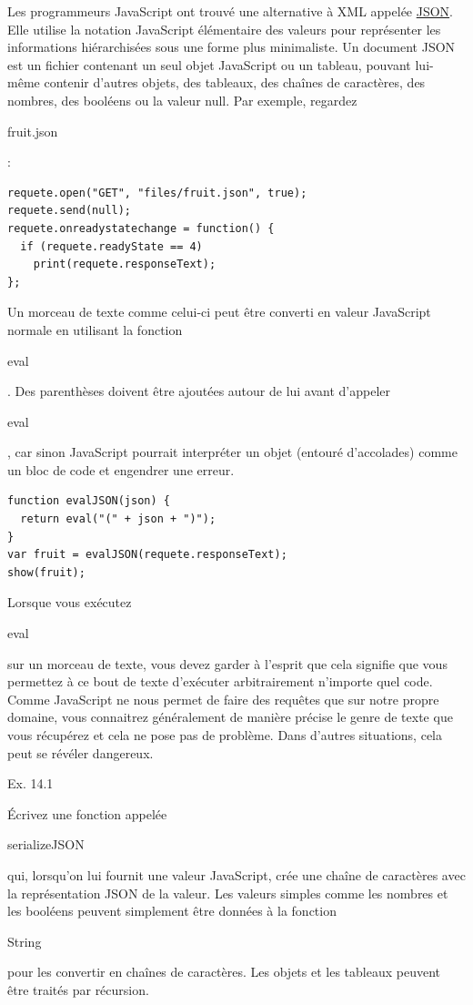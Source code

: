 \documentclass{FramateX}
\renewcommand{\texttt}[1]{\begin{sffamily}{#1}\end{sffamily}}
\begin{document}
\begin{center}\end{center}

Les programmeurs JavaScript ont trouvé une alternative à XML appelée
\href{http://www.json.org}{JSON}. Elle utilise la notation JavaScript
élémentaire des valeurs pour représenter les informations hiérarchisées
sous une forme plus minimaliste. Un document JSON est un fichier
contenant un seul objet JavaScript ou un tableau, pouvant lui-même
contenir d'autres objets, des tableaux, des chaînes de caractères, des
nombres, des booléens ou la valeur null. Par exemple, regardez
\texttt{fruit.json} :

\begin{lstlisting}
requete.open("GET", "files/fruit.json", true);
requete.send(null);
requete.onreadystatechange = function() {
  if (requete.readyState == 4)
    print(requete.responseText);
};
\end{lstlisting}
Un morceau de texte comme celui-ci peut être converti en valeur
JavaScript normale en utilisant la fonction \texttt{eval}. Des
parenthèses doivent être ajoutées autour de lui avant d'appeler
\texttt{eval}, car sinon JavaScript pourrait interpréter un objet
(entouré d'accolades) comme un bloc de code et engendrer une erreur.

\begin{lstlisting}
function evalJSON(json) {
  return eval("(" + json + ")");
}
var fruit = evalJSON(requete.responseText);
show(fruit);
\end{lstlisting}
Lorsque vous exécutez \texttt{eval} sur un morceau de texte, vous devez
garder à l'esprit que cela signifie que vous permettez à ce bout de
texte d'exécuter arbitrairement n'importe quel code. Comme JavaScript ne
nous permet de faire des requêtes que sur notre propre domaine, vous
connaitrez généralement de manière précise le genre de texte que vous
récupérez et cela ne pose pas de problème. Dans d'autres situations,
cela peut se révéler dangereux.

\begin{center}\end{center}

Ex. 14.1

Écrivez une fonction appelée \texttt{serializeJSON} qui, lorsqu'on lui
fournit une valeur JavaScript, crée une chaîne de caractères avec la
représentation JSON de la valeur. Les valeurs simples comme les nombres
et les booléens peuvent simplement être données à la fonction
\texttt{String} pour les convertir en chaînes de caractères. Les objets
et les tableaux peuvent être traités par récursion.
\end{document}
